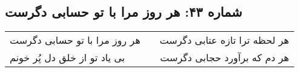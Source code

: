 \begin{center}
\section*{شماره ۴۳: هر روز مرا با تو حسابی دگرست}
\label{sec:043}
\begin{longtable}{l p{0.5cm} r}
هر روز مرا با تو حسابی دگرست
&&
هر لحظه ترا تازه عتابی دگرست
\\
بی یاد تو از خلق دل پُر خونم
&&
هر دم که برآورد حجابی دگرست
\\
\end{longtable}
\end{center}
